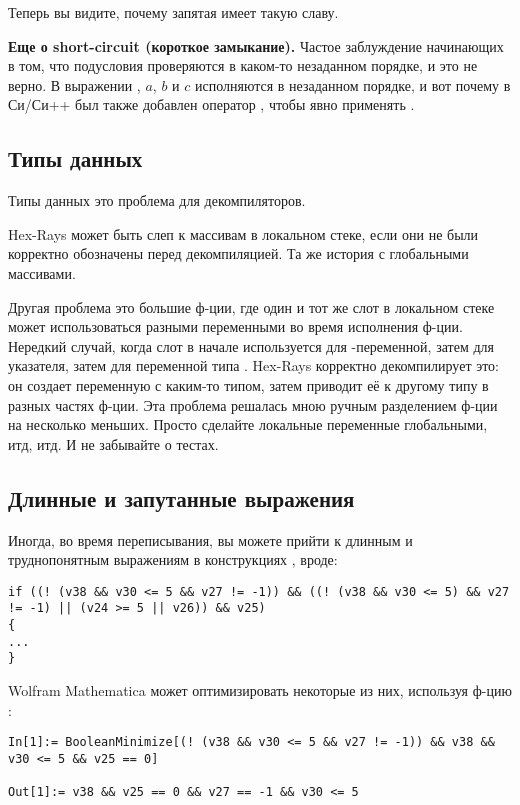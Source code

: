 Теперь вы видите, почему запятая имеет такую славу.

\textbf{Еще о short-circuit (короткое замыкание).}
Частое заблуждение начинающих в том, что подусловия проверяются в каком-то незаданном порядке, и это не верно.
В выражении , $a$, $b$ и $c$ исполняются в незаданном порядке, и вот почему в Си/Си++ был также добавлен
оператор \TT{||}, чтобы явно применять .

\subsection{Типы данных}

Типы данных это проблема для декомпиляторов.

Hex-Rays может быть слеп к массивам в локальном стеке, если они не были корректно обозначены перед декомпиляцией.
Та же история с глобальными массивами.

Другая проблема это большие ф-ции, где один и тот же слот в локальном стеке может использоваться разными переменными
во время исполнения ф-ции.
Нередкий случай, когда слот в начале используется для -переменной, затем для указателя, затем для переменной типа
.
Hex-Rays корректно декомпилирует это: он создает переменную с каким-то типом, затем приводит её к другому типу в разных частях
ф-ции.
Эта проблема решалась мною ручным разделением ф-ции на несколько меньших.
Просто сделайте локальные переменные глобальными, итд, итд.
И не забывайте о тестах.

\subsection{Длинные и запутанные выражения}

Иногда, во время переписывания, вы можете прийти к длинным и труднопонятным выражениям в конструкциях , вроде:

\begin{lstlisting}
if ((! (v38 && v30 <= 5 && v27 != -1)) && ((! (v38 && v30 <= 5) && v27 != -1) || (v24 >= 5 || v26)) && v25)
{
...
}
\end{lstlisting}

Wolfram Mathematica может оптимизировать некоторые из них, используя ф-цию :

\begin{lstlisting}
In[1]:= BooleanMinimize[(! (v38 && v30 <= 5 && v27 != -1)) && v38 && v30 <= 5 && v25 == 0]

Out[1]:= v38 && v25 == 0 && v27 == -1 && v30 <= 5
\end{lstlisting}

